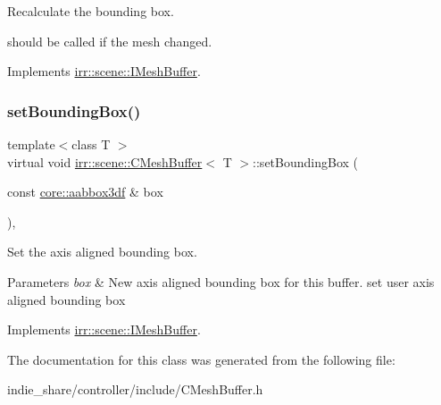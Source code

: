 Recalculate the bounding box. 

should be called if the mesh changed. 

Implements \hyperlink{classirr_1_1scene_1_1IMeshBuffer_a161877fc3afe29a816440db12a71785d}{irr\+::scene\+::\+I\+Mesh\+Buffer}.

\mbox{\label{classirr_1_1scene_1_1CMeshBuffer_ab5a21d48a5af73f1ef880a48c3798a67}} 
\subsubsection{\texorpdfstring{set\+Bounding\+Box()}{setBoundingBox()}}
{\footnotesize\ttfamily template$<$class T $>$ \\
virtual void \hyperlink{classirr_1_1scene_1_1CMeshBuffer}{irr\+::scene\+::\+C\+Mesh\+Buffer}$<$ T $>$\+::set\+Bounding\+Box (\begin{DoxyParamCaption}\item[{const \hyperlink{namespaceirr_1_1core_adfc8fa01b30044c55f3332a1d6c1aa19}{core\+::aabbox3df} \&}]{box }\end{DoxyParamCaption})\hspace{0.3cm}{\ttfamily [inline]}, {\ttfamily [virtual]}}



Set the axis aligned bounding box. 


\begin{DoxyParams}{Parameters}
{\em box} & New axis aligned bounding box for this buffer. set user axis aligned bounding box \\
\hline
\end{DoxyParams}


Implements \hyperlink{classirr_1_1scene_1_1IMeshBuffer_adbbfb7757dfbba7357193d2280893df6}{irr\+::scene\+::\+I\+Mesh\+Buffer}.



The documentation for this class was generated from the following file\+:\begin{DoxyCompactItemize}
\item 
indie\+\_\+share/controller/include/C\+Mesh\+Buffer.\+h\end{DoxyCompactItemize}
